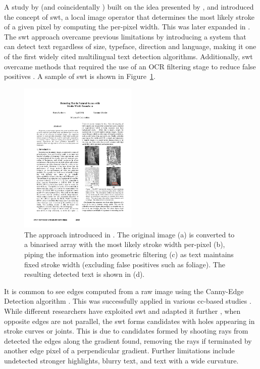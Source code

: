 A study by \citet{Epshtein:2010tj} (and coincidentally \citet{Zhang:2011cl}) built on the idea presented by \citeauthor{Subramanian:2007tf}, and introduced the concept of \gls{swt}, a local image operator that determines the most likely stroke of a given pixel by computing the per-pixel width. This was later expanded in \citet{Srivastav:2008ge}. The \gls{swt} approach overcame previous limitations by introducing a system that can detect text regardless of size, typeface, direction and language, making it one of the first widely cited multilingual text detection algorithms. Additionally, \gls{swt} overcame methods that required the use of an OCR filtering stage to reduce false positives \citep{Chen:2004tx, XiangrongChen:2004ha, Ye:2005wu}. A sample of \gls{swt} is shown in Figure~\ref{fig:background:detection:cc:epshtein2010_swt}.

\begin{figure}[h]
  \centering
  \includegraphics[width=0.5\textwidth]{images/background/epshtein2010_swt}
  \caption[Stroke Width Transformation from \citet{Epshtein:2010tj}]{The  approach introduced in \citep{Epshtein:2010tj}. The original image (a) is converted to a binarised array with the most likely stroke width per-pixel (b), piping the information into geometric filtering (c) as text maintains fixed stroke width (excluding false positives such as foliage). The resulting detected text is shown in (d).}
  \label{fig:background:detection:cc:epshtein2010_swt}
\end{figure}

It is common to see edges computed from a raw image using the Canny-Edge Detection algorithm \citep{Canny:1986uw}. This was successfully applied in various \gls{cc}-based studies \citep{Epshtein:2010tj, Chen:2011ul, Zhang:2010wa}. While different researchers have exploited \gls{swt} and adapted it further \cite{Shivakumara:2011dn, Zhang:2011cl}, when opposite edges are not parallel, the \gls{swt} forms candidates with holes appearing in stroke curves or joints. This is due to candidates formed by shooting rays from detected the edges along the gradient found, removing the rays if terminated by another edge pixel of a perpendicular gradient. Further limitations include undetected stronger highlights, blurry text, and text with a wide curvature.

